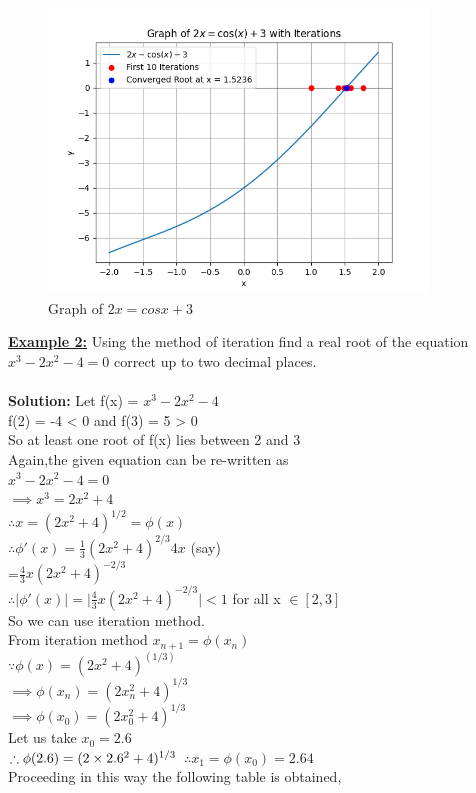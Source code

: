 \documentclass[12pt,a4paper]{article}
\begin{document}
	 \begin{figure}[h]
		\centering
		\includegraphics[width=0.9\textwidth]{iterative_ex2.png} %
		\caption{Graph of $2x = cos x + 3$}
		\label{fig:your_label_here}
	\end{figure} 
	
	
	\textbf{\underline{Example 2:}} Using the method of iteration find a real root of the equation $x^3-2x^2-4=0$ correct up to two decimal places. \\ \\
	
	\textbf{Solution:} Let f(x) = $x^3-2x^2-4$ \\
	 f(2) = -4 < 0 and f(3) = 5 > 0 \\
	 So at least one root of f(x) lies between 2 and 3 \\
	 Again,the given equation can be re-written as \\
	 $ x^3-2x^2-4=0$ \\
	 $\implies x^3= 2x^2+4 $ \\
	 
	 $\therefore x = (2x^2+4)^{1/2} = \phi(x)$\\
	 $\therefore \phi'(x)= \frac{1}{3} (2x^2+4)^{2/3} 4x$ (say) \\
	 =$\frac{4}{3}x(2x^2+4)^{-2/3}$ \\
	 $\therefore \lvert \phi'(x) \rvert = \lvert \frac{4}{3}x(2x^2 + 4)^{-2/3} \lvert < 1$ for all x $\in[2,3]$ \\
	 So we can use iteration method. \\
	 From iteration method $x_{n+1} = \phi(x_n)$ \\
	 $\because \phi(x) = (2x^2+4)^(1/3)$\\
	 $\implies \phi(x_n)=(2x_n^2+4)^{1/3}$\\
	 $\implies \phi(x_0)=(2x_0^2+4)^{1/3}$\\
	 Let us take $x_0 = 2.6$\\
	 $\therefore \phi(2.6)=(2 \times 2.6^2+4)^{1/3} \\$
	 $\therefore x_1 = \phi(x_0)=2.64$ \\
	 Proceeding in this way the following table is obtained, 
	 
\end{document}

